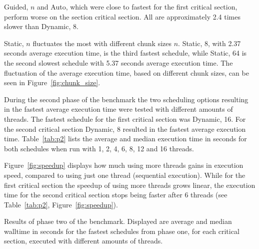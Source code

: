 \documentclass[twoside,11pt]{article}
\begin{document}
Guided, $n$ and Auto, which were close to fastest for
the first critical section, perform worse on the
section critical section. All are approximately 2.4 times
slower than Dynamic, 8.

Static, $n$ fluctuates the most with different chunk
sizes $n$.
Static, 8, with 2.37 seconds average execution time, is
the third fastest schedule, while Static, 64
is the second slowest schedule with 5.37 seconds
average execution time.
The fluctuation of the average execution time, based
on different chunk sizes, can be seen in
Figure~\ref{fig:chunk_size}.

During the second phase of the benchmark the two scheduling
options resulting in the fastest average execution time
were tested with different amounts of threads.
The fastest schedule for the first critical
section was Dynamic, 16. For the second critical section
Dynamic, 8 resulted in the fastest average execution time.
Table~\ref{tab:p2} lists the average and median execution
time in seconds for both schedules when run
with 1, 2, 4, 6, 8, 12 and 16 threads.

Figure~\ref{fig:speedup} displays how much using more
threads gains in execution speed, compared to using just
one thread (sequential execution).
While for the first critical section the speedup of using
more threads grows linear, the execution time for the
second critical section stops being faster after 6
threads (see Table~\ref{tab:p2}, Figure~\ref{fig:speedup}).

\begin{table}
\begin{center}

\caption{Results of phase two of the benchmark. Displayed
  are average and median walltime in seconds for the
  fastest schedules from phase one, for each
  critical section, executed with different amounts of
  threads.}
\label{tab:p2}
\end{center}
\end{table}
\end{document}

